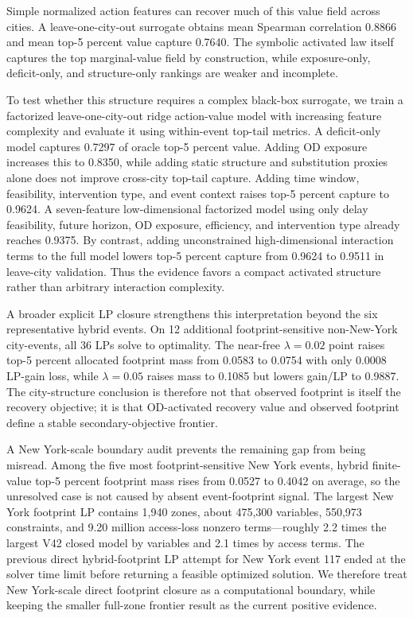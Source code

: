 Simple normalized action features can recover much of this value field across cities. A leave-one-city-out surrogate obtains mean Spearman correlation 0.8866 and mean top-5 percent value capture 0.7640. The symbolic activated law itself captures the top marginal-value field by construction, while exposure-only, deficit-only, and structure-only rankings are weaker and incomplete.

To test whether this structure requires a complex black-box surrogate, we train a factorized leave-one-city-out ridge action-value model with increasing feature complexity and evaluate it using within-event top-tail metrics. A deficit-only model captures 0.7297 of oracle top-5 percent value. Adding OD exposure increases this to 0.8350, while adding static structure and substitution proxies alone does not improve cross-city top-tail capture. Adding time window, feasibility, intervention type, and event context raises top-5 percent capture to 0.9624. A seven-feature low-dimensional factorized model using only delay feasibility, future horizon, OD exposure, efficiency, and intervention type already reaches 0.9375. By contrast, adding unconstrained high-dimensional interaction terms to the full model lowers top-5 percent capture from 0.9624 to 0.9511 in leave-city validation. Thus the evidence favors a compact activated structure rather than arbitrary interaction complexity.

A broader explicit LP closure strengthens this interpretation beyond the six representative hybrid events. On 12 additional footprint-sensitive non-New-York city-events, all 36 LPs solve to optimality. The near-free \(\lambda=0.02\) point raises top-5 percent allocated footprint mass from 0.0583 to 0.0754 with only 0.0008 LP-gain loss, while \(\lambda=0.05\) raises mass to 0.1085 but lowers gain/LP to 0.9887. The city-structure conclusion is therefore not that observed footprint is itself the recovery objective; it is that OD-activated recovery value and observed footprint define a stable secondary-objective frontier.

A New York-scale boundary audit prevents the remaining gap from being misread. Among the five most footprint-sensitive New York events, hybrid finite-value top-5 percent footprint mass rises from 0.0527 to 0.4042 on average, so the unresolved case is not caused by absent event-footprint signal. The largest New York footprint LP contains 1,940 zones, about 475,300 variables, 550,973 constraints, and 9.20 million access-loss nonzero terms---roughly 2.2 times the largest V42 closed model by variables and 2.1 times by access terms. The previous direct hybrid-footprint LP attempt for New York event 117 ended at the solver time limit before returning a feasible optimized solution. We therefore treat New York-scale direct footprint closure as a computational boundary, while keeping the smaller full-zone frontier result as the current positive evidence.

